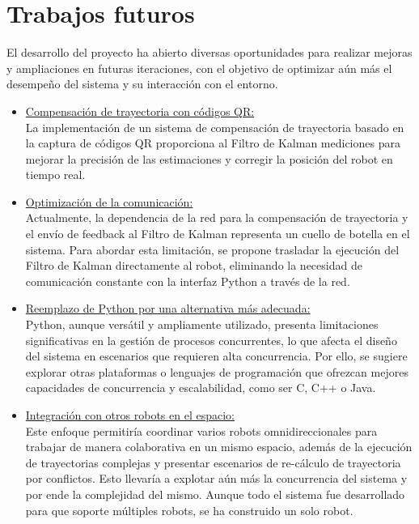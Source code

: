 \newpage
\chapter{Trabajos futuros}

El desarrollo del proyecto ha abierto diversas oportunidades para realizar mejoras y ampliaciones en futuras iteraciones, con el objetivo de optimizar aún más el desempeño del sistema y su interacción con el entorno.

\begin{itemize}
	\item \underline{Compensación de trayectoria con códigos QR:} \\
	La implementación de un sistema de compensación de trayectoria basado en la captura de códigos QR proporciona al Filtro de Kalman mediciones para mejorar la precisión de las estimaciones y corregir la posición del robot en tiempo real. \\

	\item \underline{Optimización de la comunicación:} \\
	Actualmente, la dependencia de la red para la compensación de trayectoria y el envío de feedback al Filtro de Kalman representa un cuello de botella en el sistema. Para abordar esta limitación, se propone trasladar la ejecución del Filtro de Kalman directamente al robot, eliminando la necesidad de comunicación constante con la interfaz Python a través de la red. \\

	\item \underline{Reemplazo de Python por una alternativa más adecuada:} \\
	Python, aunque versátil y ampliamente utilizado, presenta limitaciones significativas en la gestión de procesos concurrentes, lo que afecta el diseño del sistema en escenarios que requieren alta concurrencia. Por ello, se sugiere explorar otras plataformas o lenguajes de programación que ofrezcan mejores capacidades de concurrencia y escalabilidad, como ser C, C++ o Java. \\

	\item \underline{Integración con otros robots en el espacio:} \\
	Este enfoque permitiría coordinar varios robots omnidireccionales para trabajar de manera colaborativa en un mismo espacio, además de la ejecución de trayectorias complejas y presentar escenarios de re-cálculo de trayectoria por conflictos. Esto llevaría a explotar aún más la concurrencia del sistema y por ende la complejidad del mismo. Aunque todo el sistema fue desarrollado para que soporte múltiples robots, se ha construido un solo robot.


\end{itemize}
